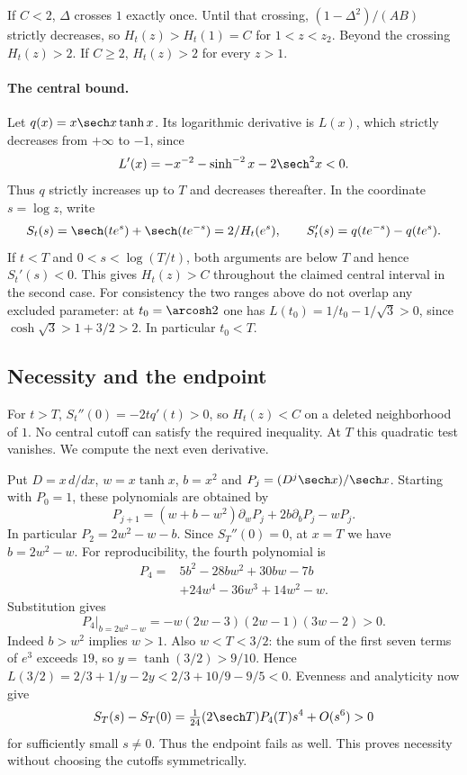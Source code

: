\documentclass[11pt,a4paper]{article}
\numberwithin{equation}{section}
\theoremstyle{definition}
\theoremstyle{remark}
\begin{document}
If $C<2$, $\Delta$ crosses $1$ exactly once. Until that crossing, $(1-\Delta^2)/(AB)$ strictly decreases, so $H_t(z)>H_t(1)=C$ for $1<z<z_2$. Beyond the crossing $H_t(z)>2$. If $C\ge2$, $H_t(z)>2$ for every $z>1$.

\paragraph{The central bound.}
Let $q(x)=x\sech x\tanh x$. Its logarithmic derivative is $L(x)$, which strictly decreases from $+\infty$ to $-1$, since
\[
 L'(x)=-x^{-2}-\sinh^{-2}x-2\sech^2x<0.
\]
Thus $q$ strictly increases up to $T$ and decreases thereafter. In the coordinate $s=\log z$, write
\[
 S_t(s)=\sech(te^s)+\sech(te^{-s})=2/H_t(e^s),
 \qquad S'_t(s)=q(te^{-s})-q(te^s).
\]
If $t<T$ and $0<s<\log(T/t)$, both arguments are below $T$ and hence $S_t'(s)<0$. This gives $H_t(z)>C$ throughout the claimed central interval in the second case. For consistency the two ranges above do not overlap any excluded parameter: at $t_0=\arcosh 2$ one has $L(t_0)=1/t_0-1/\sqrt 3>0$, since $\cosh\sqrt3>1+3/2>2$. In particular $t_0<T$.

\subsection{Necessity and the endpoint}
For $t>T$, $S_t''(0)=-2tq'(t)>0$, so $H_t(z)<C$ on a deleted neighborhood of $1$. No central cutoff can satisfy the required inequality. At $T$ this quadratic test vanishes. We compute the next even derivative.

Put $D=x\,d/dx$, $w=x\tanh x$, $b=x^2$ and $P_j=(D^j\sech x)/\sech x$. Starting with $P_0=1$, these polynomials are obtained by
\[
 P_{j+1}=(w+b-w^2)\partial_w P_j+2b\partial_bP_j-wP_j .
\]
In particular $P_2=2w^2-w-b$. Since $S_T''(0)=0$, at $x=T$ we have $b=2w^2-w$. For reproducibility, the fourth polynomial is
\begin{align*}
 P_4={}&5b^2-28bw^2+30bw-7b\\
       &+24w^4-36w^3+14w^2-w .
\end{align*}
Substitution gives
\[
 P_4\big|_{b=2w^2-w}=-w(2w-3)(2w-1)(3w-2)>0 .
\]
Indeed $b>w^2$ implies $w>1$. Also $w<T<3/2$: the sum of the first seven terms of $e^3$ exceeds $19$, so $y=\tanh(3/2)>9/10$. Hence $L(3/2)=2/3+1/y-2y<2/3+10/9-9/5<0$. Evenness and analyticity now give
\[
 S_T(s)-S_T(0)=\tfrac1{24}(2\sech T)P_4(T)s^4+O(s^6)>0
\]
for sufficiently small $s\ne0$. Thus the endpoint fails as well. This proves necessity without choosing the cutoffs symmetrically.
\end{document}

